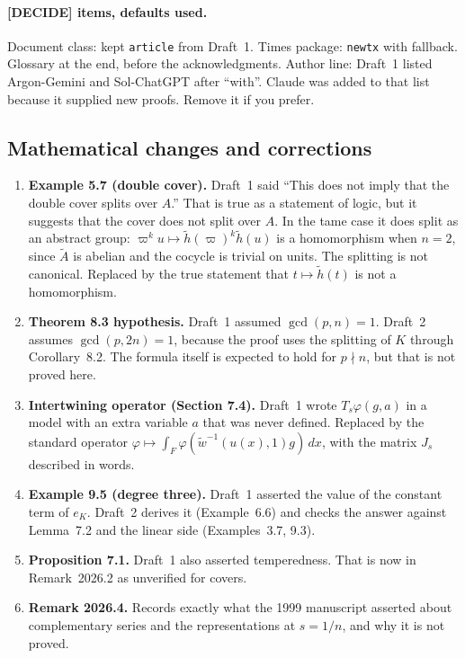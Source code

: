 \documentclass[12pt,letterpaper]{article}
\newcommand{\At}{\widetilde A}
\newcommand{\hl}{\tilde h}
\newcommand{\wt}{\tilde w}
\begin{document}
\paragraph{[DECIDE] items, defaults used.} Document class: kept
\texttt{article} from Draft~1. Times package: \texttt{newtx} with
fallback. Glossary at the end, before the acknowledgments. Author
line: Draft~1 listed Argon-Gemini and Sol-ChatGPT after ``with''.
Claude was added to that list because it supplied new proofs. Remove
it if you prefer.

\subsection{Mathematical changes and corrections}
\begin{enumerate}[leftmargin=*]
\item \textbf{Example 5.7 (double cover).} Draft~1 said ``This does not
  imply that the double cover splits over $A$.'' That is true as a
  statement of logic, but it suggests that the cover does not split
  over $A$. In the tame case it does split as an abstract group:
  $\varpi^ku\mapsto\hl(\varpi)^k\hl(u)$ is a homomorphism when $n=2$,
  since $\At$ is abelian and the cocycle is trivial on units. The
  splitting is not canonical. Replaced by the true statement that
  $t\mapsto\hl(t)$ is not a homomorphism.
\item \textbf{Theorem 8.3 hypothesis.} Draft~1 assumed $\gcd(p,n)=1$.
  Draft~2 assumes $\gcd(p,2n)=1$, because the proof uses the splitting
  of $K$ through Corollary~8.2. The formula itself is expected to hold
  for $p\nmid n$, but that is not proved here.
\item \textbf{Intertwining operator (Section 7.4).} Draft~1 wrote
  $T_s\varphi(g,a)$ in a model with an extra variable $a$ that was
  never defined. Replaced by the standard operator
  $\varphi\mapsto\int_F\varphi(\wt^{-1}(u(x),1)g)\,dx$, with the
  matrix $J_s$ described in words.
\item \textbf{Example 9.5 (degree three).} Draft~1 asserted the value
  of the constant term of $e_K$. Draft~2 derives it (Example~6.6) and
  checks the answer against Lemma~7.2 and the linear side
  (Examples~3.7, 9.3).
\item \textbf{Proposition 7.1.} Draft~1 also asserted temperedness.
  That is now in Remark~2026.2 as unverified for covers.
\item \textbf{Remark 2026.4.} Records exactly what the 1999 manuscript
  asserted about complementary series and the representations at
  $s=1/n$, and why it is not proved.
\end{enumerate}
\end{document}

